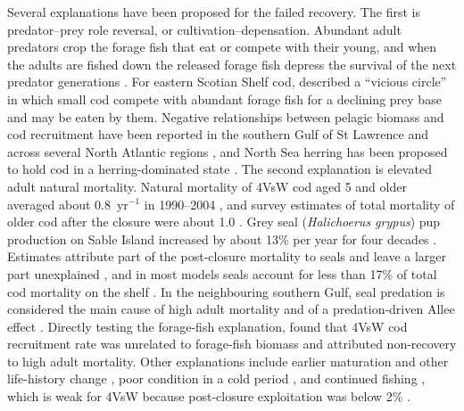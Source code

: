 \documentclass[12pt,letterpaper,fleqn]{article}
\newcommand{\yr}{yr$^{-1}$}
\begin{document}
Several explanations have been proposed for the failed recovery. The first is predator--prey role reversal, or cultivation--depensation. Abundant adult predators crop the forage fish that eat or compete with their young, and when the adults are fished down the released forage fish depress the survival of the next predator generations \autocite{walters2001cultivation}. For eastern Scotian Shelf cod, \textcite{bundy2005can} described a ``vicious circle'' in which small cod compete with abundant forage fish for a declining prey base and may be eaten by them. Negative relationships between pelagic biomass and cod recruitment have been reported in the southern Gulf of St Lawrence \autocite{swain2000pelagic} and across several North Atlantic regions \autocite{minto2012interactions}, and North Sea herring has been proposed to hold cod in a herring-dominated state \autocite{fauchald2010predator}. The second explanation is elevated adult natural mortality. Natural mortality of 4VsW cod aged 5 and older averaged about 0.8~\yr{} in 1990--2004 \autocite{mohn2012laurentian}, and survey estimates of total mortality of older cod after the closure were about 1.0 \autocite{fanning2003assessment}. Grey seal (\textit{Halichoerus grypus}) pup production on Sable Island increased by about 13\% per year for four decades \autocite{bowen2003sustained}. Estimates attribute part of the post-closure mortality to seals and leave a larger part unexplained \autocite{trzcinski2006continued}, and in most models seals account for less than 17\% of total cod mortality on the shelf \autocite{dfo2010greyseals}. In the neighbouring southern Gulf, seal predation is considered the main cause of high adult mortality and of a predation-driven Allee effect \autocite{swain2015extreme,neuenhoff2019continued}. Directly testing the forage-fish explanation, \textcite{swain2012forage} found that 4VsW cod recruitment rate was unrelated to forage-fish biomass and attributed non-recovery to high adult mortality. Other explanations include earlier maturation and other life-history change \autocite{olsen2004maturation,hutchings2005life,swain2011life}, poor condition in a cold period \autocite{dutil2000natural,choi2004transition}, and continued fishing \autocite{shelton2006fishing}, which is weak for 4VsW because post-closure exploitation was below 2\% \autocite{cosewic2010cod}.
\end{document}
